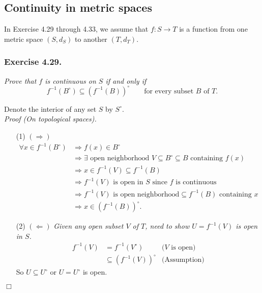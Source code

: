 \documentclass{article}
\begin{document}



\subsection*{Continuity in metric spaces \\}



In Exercise 4.29 through 4.33, we assume that $f: S \rightarrow T$ is a function
from one metric space $(S, d_S)$ to another $(T, d_T)$. \\



\subsubsection*{Exercise 4.29.}
\emph{Prove that $f$ is continuous on $S$ if and only if
$$f^{-1}(B^{\circ}) \subseteq (f^{-1}(B))^{\circ}
\qquad \text{for every subset $B$ of $T$}.$$}

Denote the interior of any set $S$ by $S^{\circ}$. \\

\emph{Proof (On topological spaces).}
\begin{enumerate}
\item[(1)]
$(\Longrightarrow)$
\begin{align*}
  \forall x \in f^{-1}(B^{\circ})
  &\Longrightarrow
  f(x) \in B^{\circ} \\
  &\Longrightarrow
  \exists \text{ open neighborhood } V \subseteq B^{\circ} \subseteq B \text{ containing } f(x) \\
  &\Longrightarrow
  x \in f^{-1}(V) \subseteq f^{-1}(B) \\
  &\Longrightarrow
  f^{-1}(V) \text{ is open in $S$ since $f$ is continuous} \\
  &\Longrightarrow
  f^{-1}(V)\text{ is open neighborhood} \subseteq f^{-1}(B) \text{ containing } x \\
  &\Longrightarrow
  x \in (f^{-1}(B))^{\circ}.
\end{align*}
\item[(2)]
$(\Longleftarrow)$
\emph{Given any open subset $V$ of $T$, need to show
$U = f^{-1}(V)$ is open in $S$.}
\begin{align*}
f^{-1}(V)
&= f^{-1}(V^{\circ})
  &\text{($V$ is open)} \\
&\subseteq (f^{-1}(V))^{\circ}
  &\text{(Assumption)}
\end{align*}
So $U \subseteq U^{\circ}$ or $U = U^{\circ}$ is open.
\end{enumerate}
$\Box$ \\\\
\end{document}
